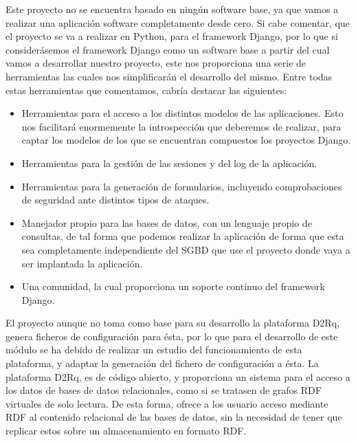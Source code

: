 Este proyecto no se encuentra basado en ningún software base, ya que vamos a
realizar una aplicación software completamente desde cero. Si cabe comentar, que
el proyecto se va a realizar en Python, para el framework Django, por lo que si
considerásemos el framework Django como un software base a partir del cual vamos
a desarrollar nuestro proyecto, este nos proporciona una serie de herramientas
las cuales nos simplificarán el desarrollo del mismo. Entre todas estas
herramientas que comentamos, cabría destacar las siguientes:
\begin{itemize}
    \item Herramientas para el acceso a los distintos modelos de las
           aplicaciones. Esto nos facilitará enormemente la introspección que
           deberemos de realizar, para captar los modelos de los que se
           encuentran compuestos los proyectos Django.
    \item Herramientas para la gestión de las sesiones y del log de la
           aplicación.
    \item Herramientas para la generación de formularios, incluyendo
           comprobaciones de seguridad ante distintos tipos de ataques.
    \item Manejador propio para las bases de datos, con un lenguaje propio de
           consultas, de tal forma que podemos realizar la aplicación de forma
           que esta sea completamente independiente del SGBD que use el proyecto
           donde vaya a ser implantada la aplicación.
    \item Una comunidad, la cual proporciona un soporte continuo del framework
           Django.
\end{itemize}

El proyecto aunque no toma como base para su desarrollo la plataforma D2Rq,
genera ficheros de configuración para ésta, por lo que para el desarrollo de
este módulo se ha debido de realizar un estudio del funcionamiento de esta
plataforma, y adaptar la generación del fichero de configuración a ésta. La
plataforma D2Rq, es de código abierto, y proporciona un sistema para el acceso a
los datos de bases de datos relacionales, como si se tratasen de grafos RDF
virtuales de solo lectura. De esta forma, ofrece a los usuario acceso mediante
RDF al contenido relacional de las bases de datos, sin la necesidad de tener que
replicar estos sobre un almacenamiento en formato RDF.
